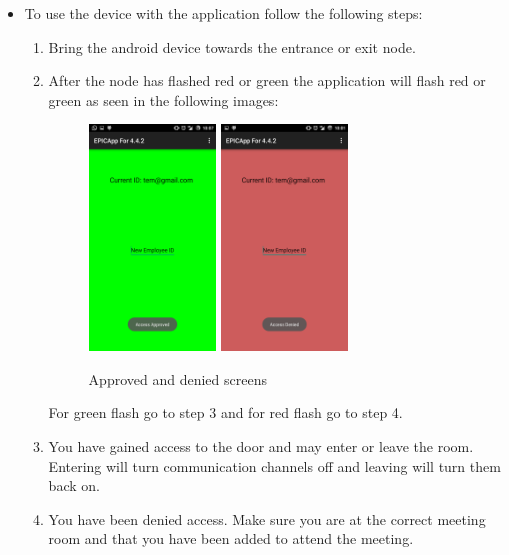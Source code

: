 \documentclass[a4paper,12pt,titlepage]{article}
\begin{document}
    \begin{itemize}
        \item To use the device with the application follow the following steps:
            \begin{enumerate}
                \item Bring the android device towards the entrance or exit node.
                \item {After the node has flashed red or green the application will flash red or green as seen in the following images:
                    \begin{figure}[H]
                    \center
                    \includegraphics[height=6cm]{Approved}
                    \includegraphics[height=6cm]{Denied}
                    \caption{Approved and denied screens}
                    \label{fig:my_label3}
                    \end{figure}}
                For green flash go to step 3 and for red flash go to step 4.
                \item{You have gained access to the door and may enter or leave the room. Entering will turn communication channels off and leaving will turn them back on.}
                \item{You have been denied access. Make sure you are at the correct meeting room and that you have been added to attend the meeting.}

\end{enumerate}
\end{itemize}
\end{document}
